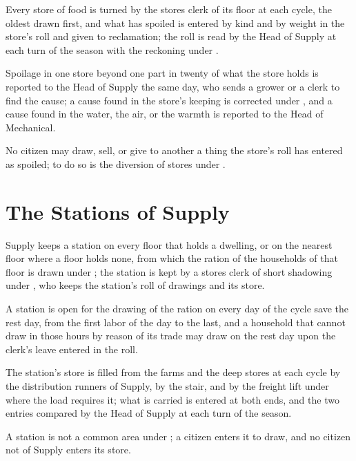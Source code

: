 \begin{clauses}
\item Every store of food is turned by the stores clerk of its floor at each cycle, the oldest drawn first, and what has spoiled is entered by kind and by weight in the store's roll and given to reclamation; the roll is read by the Head of Supply at each turn of the season with the reckoning under .
\item Spoilage in one store beyond one part in twenty of what the store holds is reported to the Head of Supply the same day, who sends a grower or a clerk to find the cause; a cause found in the store's keeping is corrected under , and a cause found in the water, the air, or the warmth is reported to the Head of Mechanical.
\item No citizen may draw, sell, or give to another a thing the store's roll has entered as spoiled; to do so is the diversion of stores under .
\end{clauses}

\section{The Stations of Supply}
\label{sec:supply:stations-of-supply}

\begin{clauses}
\item Supply keeps a station on every floor that holds a dwelling, or on the nearest floor where a floor holds none, from which the ration of the households of that floor is drawn under ; the station is kept by a stores clerk of short shadowing under , who keeps the station's roll of drawings and its store.
\item A station is open for the drawing of the ration on every day of the cycle save the rest day, from the first labor of the day to the last, and a household that cannot draw in those hours by reason of its trade may draw on the rest day upon the clerk's leave entered in the roll.
\item The station's store is filled from the farms and the deep stores at each cycle by the distribution runners of Supply, by the stair, and by the freight lift under  where the load requires it; what is carried is entered at both ends, and the two entries compared by the Head of Supply at each turn of the season.
\item A station is not a common area under ; a citizen enters it to draw, and no citizen not of Supply enters its store.
\end{clauses}

